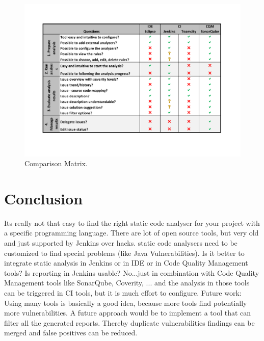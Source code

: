 \documentclass[conference]{IEEEtran}
\begin{document}
\begin{figure}[t]
	\includegraphics[width=\textwidth]{img/comparation}
	\caption{Comparison Matrix.}
	\label{fig:comparison_matrix}
\end{figure}

\section{Conclusion}
\label{sec:conclusion}
Its really not that easy to find the right static code analyser for your project with a specific programming language. There are lot of open source tools, but very old and just supported by Jenkins over hacks. static code analysers need to be customized to find special problems (like Java Vulnerabilities). Is it better to integrate static analysis in Jenkins or in IDE or in Code Quality Management tools? Is reporting in Jenkins usable? No...just in combination with Code Quality Management tools like SonarQube, Coverity, ... and the analysis in those tools can be triggered in CI tools, but it is much effort to configure.
Future work: Using many tools is basically a good idea, because more tools find potentially more vulnerabilities. A future approach would be to implement a tool that can filter all the generated reports. Thereby duplicate vulnerabilities findings can be merged and false positives can be reduced.




\end{document}
